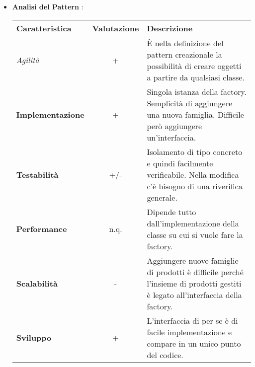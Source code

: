 {{{\begin{itemize}
				\item \textbf{Analisi del Pattern} :
				\small %
				{\renewcommand\arraystretch{1.2} %
					\begin{tabular}{|l|c|l|}
						\hline
						{\textbf{Caratteristica}}&{\textbf{Valutazione}}&{\textbf{Descrizione}}\\
						\hline
						\textit{Agilità} & + & È nella definizione del pattern creazionale la possibilità di creare oggetti a partire da qualsiasi classe. \\
						\hline
						\textbf{Implementazione} & + & Singola istanza della factory. Semplicità di aggiungere una nuova famiglia. Difficile però aggiungere un'interfaccia. \\
						\hline
						\textbf{Testabilità} & +/- & Isolamento di tipo concreto e quindi facilmente verificabile. Nella modifica c'è bisogno di una riverifica generale. \\
						\hline
						\textbf{Performance} & n.q. & Dipende tutto dall'implementazione della classe su cui si vuole fare la factory. \\
						\hline
						\textbf{Scalabilità} & - & Aggiungere nuove famiglie di prodotti è difficile perché l’insieme di prodotti gestiti è legato all'interfaccia della factory. \\
						\hline
						\textbf{Sviluppo} & + & L'interfaccia di per se è di facile implementazione e compare in un unico punto del codice. \\
						\hline
					\end{tabular}
				}
			\end{itemize}
		}
	
}}
